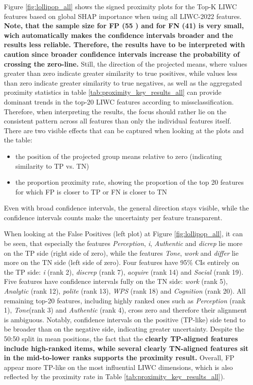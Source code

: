 Figure \ref{fig:lollipop_all} shows the signed proximity plots for the Top-K LIWC features based on global SHAP importance when using all LIWC-2022 features. \textbf{Note, that the sample size for FP (55 ) and for FN (41) is very small, wich automatically makes the confidence intervals broader and the results less reliable. Therefore, the results have to be interpreted with caution since broader confidence intervals increase the probability of crossing the zero-line.} Still, the direction of the projected means, where values greater than zero indicate greater similarity to true positives, while values less than zero indicate greater similarity to true negatives, as well as the aggregated proximity statistics in table \ref{tab:proximity_key_results_all} can provide dominant trends in the top-20 LIWC features according to missclassification. Therefore, when interpreting the results, the focus should rather lie on the consistent pattern across all features than only the individual features itself. There are two visible effects that can be captured when looking at the plots and the table:

\begin{itemize}
  \item the position of the projected group means relative to zero (indicating similarity to TP vs. TN)
  \item the proportion proximity rate, showing the proportion of the top 20 features for which FP is closer to TP or FN is closer to TN
\end{itemize}

Even with broad confidence intervals, the general direction stays visible, while the confidence intervals counts make the uncertainty per feature transparent.

When looking at the False Positives (left plot) at Figure \ref{fig:lollipop_all}, it can be seen, that especially the features \textit{Perception}, \textit{i}, \textit{Authentic} and \textit{dicrep} lie more on the TP side (right side of zero), while the features \textit{Tone}, \textit{work} and \textit{differ} lie more on the TN side (left side of zero).  
Four features have 95\% CIs entirely on the TP side: \textit{i} (rank 2), \textit{discrep} (rank 7), \textit{acquire} (rank 14) and \textit{Social} (rank 19). Five features have confidence intervals fully on the TN side: \textit{work} (rank 5), \textit{Analytic} (rank 12), \textit{polite} (rank 13), \textit{WPS} (rank 18) and \textit{Cognition} (rank 20). All remaining top-20 features, including highly ranked ones such as \textit{Perception} (rank 1), \textit{Tone}(rank 3) and \textit{Authentic} (rank 4), cross zero and therefore their alignment is ambiguous. Notably, confidence intervals on the positive (TP-like) side tend to be broader than on the negative side, indicating greater uncertainty. Despite the 50:50 split in mean positions, the fact that the \textbf{clearly TP-aligned features include high-ranked items, while several clearly TN-aligned features sit in the mid-to-lower ranks supports the proximity result.} Overall, FP appear more TP-like on the most influential LIWC dimensions, which is also reflected by the proximity rate in Table \ref{tab:proximity_key_results_all}).


